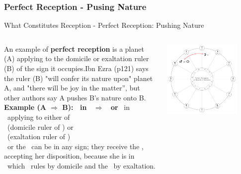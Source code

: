 \subsubsection{Perfect Reception - Pusing Nature}
\begin{frame}[t]{What Constitutes Reception - Perfect Reception: Pushing Nature}
\small
\vspace{0.1cm}
\begin{columns}[T, onlytextwidth]
An example of \textbf{perfect reception} is a planet (A) applying to the domicile or exaltation ruler (B) of the sign it occupies.\footnotemark[1] Ibn Ezra (p121) says the ruler (B) "will confer its nature upon" planet A, and "there will be joy in the matter'', but other authors say A pushes B's nature onto B.  \\
\vspace{0.2cm}
\textbf{Example (A $\Rightarrow$ B): \Moon\ in \Aries\ $\Rightarrow$ \Mars\ or \Sun} 
\ul
\vspace{0.2cm}
\Moon\ in \Aries\ applying to either of \\
\Mars\ (domicile ruler of \Aries) or \\
\Sun\ (exaltation ruler of \Aries) \\
\vspace{0.2cm}
\Mars\ or the \Sun\ can be in any sign; they receive the \Moon, accepting her disposition, because she is in \Aries\ which \Mars\ rules by domicile and the \Sun\ by exaltation. \\

\begin{center}
{\includegraphics[width=0.8\textwidth]{charts/01-perfect-reception}} \\
\end{center}

\end{columns}
\vspace{0.2cm}
\end{frame}
